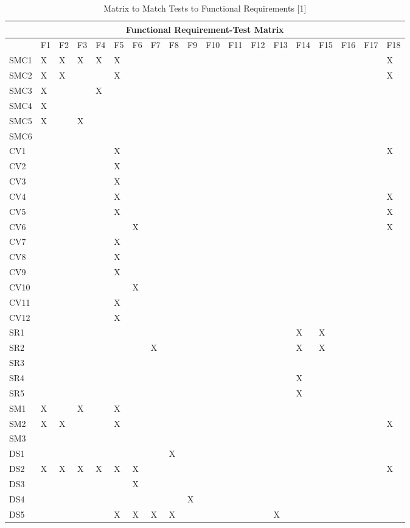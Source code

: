 \documentclass[11pt]{article}
\begin{document}
\begin{table}[H]
\centering
\caption{Matrix to Match Tests to Functional Requirements [1]}
\label{label1}
\begin{tabular}{| l | l | l | l | l | l | l | l | l | l | l | l | l | l | l | l | l | l | l |}
\hline
\multicolumn{19}{|c|}{\textbf{Functional Requirement-Test Matrix}}                          \\ \hline
 & \tiny{F1} & \tiny{F2} & \tiny{F3} & \tiny{F4} & \tiny{F5} & \tiny{F6} & \tiny{F7} & \tiny{F8} & \tiny{F9} & \tiny{F10} & \tiny{F11} & \tiny{F12} & \tiny{F13} & \tiny{F14} & \tiny{F15} & \tiny{F16} & \tiny{F17} & \tiny{F18} \\ \hline
SMC1&X&X&X&X&X&&&&&&&&&&&&&X \\ \hline
SMC2&X&X&&&X&&&&&&&&&&&&&X \\ \hline
SMC3&X&&&X&&&&&&&&&&&&&& \\ \hline
SMC4&X&&&&&&&&&&&&&&&&& \\ \hline
SMC5&X&&X&&&&&&&&&&&&&&& \\ \hline
SMC6&&&&&&&&&&&&&&&&&& \\ \hline
CV1&&&&&X&&&&&&&&&&&&&X \\ \hline
CV2&&&&&X&&&&&&&&&&&&& \\ \hline
CV3&&&&&X&&&&&&&&&&&&& \\ \hline
CV4&&&&&X&&&&&&&&&&&&&X \\ \hline
CV5&&&&&X&&&&&&&&&&&&&X \\ \hline
CV6&&&&&&X&&&&&&&&&&&&X \\ \hline
CV7&&&&&X&&&&&&&&&&&&& \\ \hline
CV8&&&&&X&&&&&&&&&&&&& \\ \hline
CV9&&&&&X&&&&&&&&&&&&& \\ \hline
CV10&&&&&&X&&&&&&&&&&&& \\ \hline
CV11&&&&&X&&&&&&&&&&&&& \\ \hline
CV12&&&&&X&&&&&&&&&&&&& \\ \hline
SR1&&&&&&&&&&&&&&X&X&&& \\ \hline
SR2&&&&&&&X&&&&&&&X&X&&& \\ \hline
SR3&&&&&&&&&&&&&&&&&& \\ \hline
SR4&&&&&&&&&&&&&&X&&&& \\ \hline
SR5&&&&&&&&&&&&&&X&&&& \\ \hline
SM1&X&&X&&X&&&&&&&&&&&&& \\ \hline
SM2&X&X&&&X&&&&&&&&&&&&&X \\ \hline
SM3&&&&&&&&&&&&&&&&&& \\ \hline
DS1&&&&&&&&X&&&&&&&&&& \\ \hline
DS2&X&X&X&X&X&X&&&&&&&&&&&&X \\ \hline
DS3&&&&&&X&&&&&&&&&&&& \\ \hline
DS4&&&&&&&&&X&&&&&&&&& \\ \hline
DS5&&&&&X&X&X&X&&&&&X&&&&& \\ \hline
\end{tabular}
\end{table}
\end{document}
